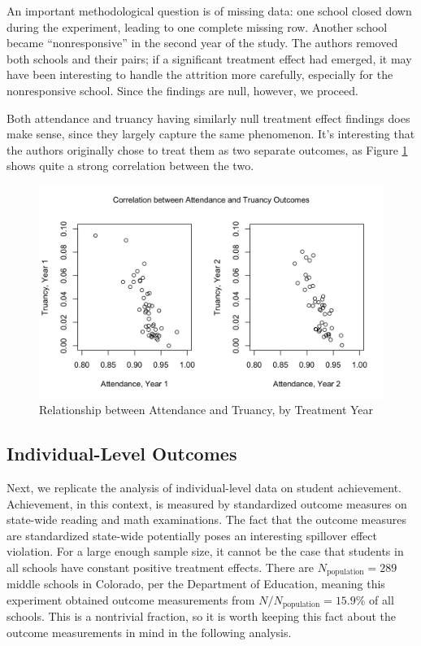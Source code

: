 \documentclass[11pt]{article}
\begin{document}
An important methodological question is of missing data: one school closed down
during the experiment, leading to one complete missing row. Another school
became ``nonresponsive'' in the second year of the study. The authors removed
both schools and their pairs; if a significant treatment effect had emerged, it
may have been interesting to handle the attrition more carefully, especially
for the nonresponsive school. Since the findings are null, however, we proceed.

Both attendance and truancy having similarly null treatment effect findings does make sense,
since they largely capture the same phenomenon. It's interesting that the authors originally
chose to treat them as two separate outcomes, as Figure \ref{fig:attendance_vs_truancy} shows
quite a strong correlation between the two.

\begin{figure}[htbp]
    \includegraphics[scale=0.3]{img/attendance_vs_truancy.png}
    \caption{Relationship between Attendance and Truancy, by Treatment Year}
    \label{fig:attendance_vs_truancy}
\end{figure}

\subsection{Individual-Level Outcomes}
Next, we replicate the analysis of individual-level data on student
achievement. Achievement, in this context, is measured by standardized outcome
measures on state-wide reading and math examinations. The fact that the outcome
measures are standardized state-wide potentially poses an interesting spillover
effect violation. For a large enough sample size, it cannot be the case that
students in all schools have constant positive treatment effects. There are
$N_\text{population} = 289$ middle schools in Colorado, per the Department of
Education, meaning this experiment obtained outcome measurements from $N /
N_\text{population} = 15.9\%$ of all schools. This is a nontrivial fraction,
so it is worth keeping this fact about the outcome measurements in mind in the following
analysis.
\end{document}
